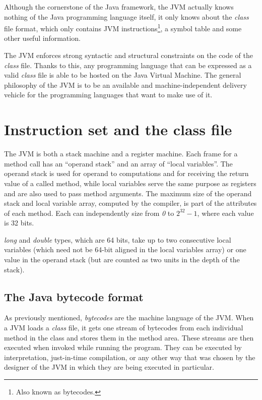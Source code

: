 \documentclass[english,runningheads,a4paper]{llncs}[2018/03/10]
\begin{document}
Although the cornerstone of the Java framework, the JVM actually knows nothing
of the Java programming language itself, it only knows about the \textit{class}
file format, which only contains JVM instructions\footnote{Also known as
bytecodes.}, a symbol table and some other useful information.

The JVM enforces strong syntactic and structural constraints on the code of the
\textit{class} file. Thanks to this, any programming language that can be
expressed as a valid \textit{class} file is able to be hosted on the Java
Virtual Machine. The general philosophy of the JVM is to be an available and
machine-independent delivery vehicle for the programming languages that want to
make use of it. \parencite{gojava}

\section*{Instruction set and the class file}
The JVM is both a stack machine and a register machine. Each frame for a method
call has an ``operand stack'' and an array of ``local variables''. The operand
stack is used for operand to computations and for receiving the return value of
a called method, while local variables serve the same purpose as registers and
are also used to pass method arguments. The maximum size of the operand stack
and local variable array, computed by the compiler, is part of the attributes of
each method. Each can independently size from \textit{0} to \(2^{32} - 1\),
where each value is 32 bits.

\textit{long} and \textit{double} types, which are 64 bits, take up to two
consecutive local variables (which need not be 64-bit aligned in the local
variables array) or one value in the operand stack (but are counted as two units
in the depth of the stack).

\subsection*{The Java bytecode format}
As previously mentioned, \textit{bytecodes} are the machine language of the JVM.
When a JVM loads a \textit{class} file, it gets one stream of bytecodes from
each individual method in the class and stores them in the method area. These
streams are then executed when invoked while running the program. They can be
executed by interpretation, just-in-time compilation, or any other way that was
chosen by the designer of the JVM in which they are being executed in
particular.
\end{document}
